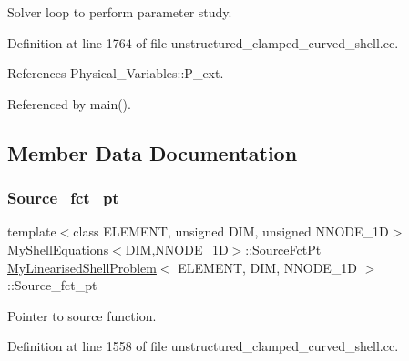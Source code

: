 Solver loop to perform parameter study. 



Definition at line 1764 of file unstructured\+\_\+clamped\+\_\+curved\+\_\+shell.\+cc.



References Physical\+\_\+\+Variables\+::\+P\+\_\+ext.



Referenced by main().



\subsection{Member Data Documentation}
\mbox{\label{classMyLinearisedShellProblem_a55fd5e4ce59d478cb41bd8457e868dea}} 
\subsubsection{\texorpdfstring{Source\+\_\+fct\+\_\+pt}{Source\_fct\_pt}}
{\footnotesize\ttfamily template$<$class E\+L\+E\+M\+E\+NT, unsigned D\+IM, unsigned N\+N\+O\+D\+E\+\_\+1D$>$ \\
\hyperlink{classoomph_1_1MyShellEquations}{My\+Shell\+Equations}$<$D\+IM,N\+N\+O\+D\+E\+\_\+1D$>$\+::Source\+Fct\+Pt \hyperlink{classMyLinearisedShellProblem}{My\+Linearised\+Shell\+Problem}$<$ E\+L\+E\+M\+E\+NT, D\+IM, N\+N\+O\+D\+E\+\_\+1D $>$\+::Source\+\_\+fct\+\_\+pt\hspace{0.3cm}{\ttfamily [private]}}



Pointer to source function. 



Definition at line 1558 of file unstructured\+\_\+clamped\+\_\+curved\+\_\+shell.\+cc.

\mbox{\label{classMyLinearisedShellProblem_a18e84aab4a7fad179e35d381e61c4584}} 
